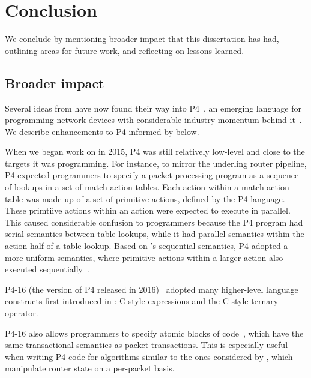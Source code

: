 \chapter{Conclusion}
\label{chap:concl}

We conclude by mentioning broader impact that this dissertation has had,
outlining areas for future work, and reflecting on lessons learned.

\section{Broader impact}
Several ideas from \pktlanguage have now found their way into P4~\cite{p4}, an
emerging language for programming network devices with considerable industry
momentum behind it~\cite{p4org}. We describe enhancements to P4 informed by
\pktlanguage below.
\begin{CompactEnumerate}
\item When we began work on \pktlanguage in 2015, P4 was still relatively
low-level and close to the targets it was programming. For instance, to mirror
the underling router pipeline, P4 expected programmers to specify a
packet-processing program as a sequence of lookups in a set of match-action
tables. Each action within a match-action table was made up of a set of
primitive actions, defined by the P4 language. These primtiive actions within
an action were expected to execute in parallel. This caused considerable
confusion to programmers because the P4 program had serial semantics between
table lookups, while it had parallel semantics within the action half of a
table lookup. Based on \pktlanguage's sequential semantics, P4 adopted a more
uniform semantics, where primitive actions within a larger action also executed
sequentially~\cite{p4_sequential_pr, p4_sequential_issue}.
\item P4-16 (the version of P4 released in 2016)~\cite{p4_16} adopted many
higher-level language constructs first introduced in \pktlanguage: C-style
expressions and the C-style ternary operator.
\item P4-16 also allows programmers to specify atomic blocks of code~\cite{p4_atomic_pr, p4_atomic_issue}, which
have the same transactional semantics as packet transactions. This is
especially useful when writing P4 code for algorithms similar to the ones
considered by \pktlanguage, which manipulate router state on a per-packet
basis.
\end{CompactEnumerate}


